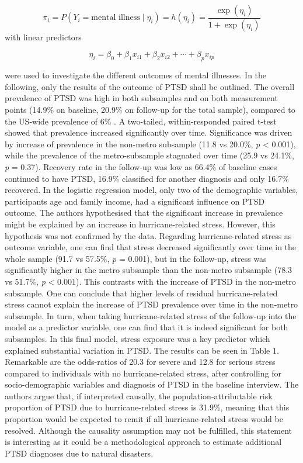 \documentclass[
]{krantz}
\begin{document}
\[
\pi_i = P(Y_i = \text{mental illness} \mid \eta_i) = h(\eta_i) = \frac{\exp(\eta_i)}{1 + \exp(\eta_i)}
\]
with linear predictors

\[
\eta_i = \beta_0 + \beta_1 x_{i1} + \beta_2 x_{i2} + \cdots + \beta_p x_{ip}
\]

were used to investigate the different outcomes of mental illnesses. In the following, only the results of the outcome of PTSD shall be outlined.
The overall prevalence of PTSD was high in both subsamples and on both measurement points (14.9\% on baseline, 20.9\% on follow-up for the total sample), compared to the US-wide prevalence of 6\% \citep{goldsteinEpidemiologyDSM5Posttraumatic2016}. A two-tailed, within-responded paired t-test showed that prevalence increased significantly over time. Significance was driven by increase of prevalence in the non-metro subsample (11.8 vs 20.0\%, \emph{p} \textless{} 0.001), while the prevalence of the metro-subsample stagnated over time (25.9 vs 24.1\%, \emph{p} = 0.37). Recovery rate in the follow-up was low as 66.4\% of baseline cases continued to have PTSD, 16.9\% classified for another diagnosis and only 16.7\% recovered. In the logistic regression model, only two of the demographic variables, participants age and family income, had a significant influence on PTSD outcome.
The authors hypothesised that the significant increase in prevalence might be explained by an increase in hurricane-related stress. However, this hypothesis was not confirmed by the data. Regarding hurricane-related stress as outcome variable, one can find that stress decreased significantly over time in the whole sample (91.7 vs 57.5\%, \emph{p} = 0.001), but in the follow-up, stress was significantly higher in the metro subsample than the non-metro subsample (78.3 vs 51.7\%, \emph{p} \textless{} 0.001). This contrasts with the increase of PTSD in the non-metro subsample. One can conclude that higher levels of residual hurricane-related stress cannot explain the increase of PTSD prevalence over time in the non-metro subsample. In turn, when taking hurricane-related stress of the follow-up into the model as a predictor variable, one can find that it is indeed significant for both subsamples. In this final model, stress exposure was a key predictor which explained substantial variation in PTSD. The results can be seen in Table 1. Remarkable are the odds-ratios of 20.3 for severe and 12.8 for serious stress compared to individuals with no hurricane-related stress, after controlling for socio-demographic variables and diagnosis of PTSD in the baseline interview. The authors argue that, if interpreted causally, the population-attributable risk proportion of PTSD due to hurricane-related stress is 31.9\%, meaning that this proportion would be expected to remit if all hurricane-related stress would be resolved. Although the causality assumption may not be fulfilled, this statement is interesting as it could be a methodological approach to estimate additional PTSD diagnoses due to natural disasters.
\end{document}
